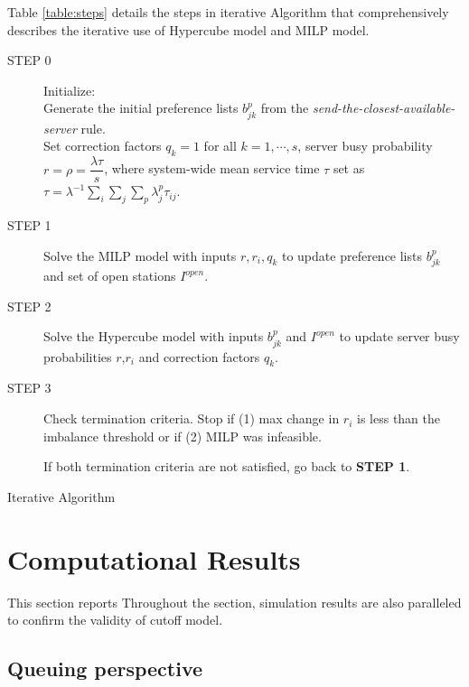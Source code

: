 \documentclass{article}
\begin{document}
Table \eqref{table:steps} details the steps in iterative Algorithm that comprehensively describes the iterative use of Hypercube model and MILP model. 


\begin{table}
\noindent\makebox[\linewidth]{\rule{16cm}{0.4pt}}
\begin{description}
\item[STEP 0] Initialize:\\
Generate the initial preference lists $b^p_{jk}$ from the \textit{send-the-closest-available-server} rule. \\
Set correction factors $q_k=1$ for all $k=1,\cdots,s$, server busy probability $r=\rho=\dfrac{\lambda \tau}{s}$, where system-wide mean service time $\tau$ set as $\tau= \lambda^{-1} \sum_i \sum_j  \sum_p \lambda^p_j \tau_{ij}$.  
\item[STEP 1] Solve the MILP model with inputs $r,r_i,q_k$ to update preference lists $b^p_{jk}$ and set of open stations $I^{open}$.
\item[STEP 2] Solve the Hypercube model with inputs $b^p_{jk}$ and $I^{open}$ to update server busy probabilities $r$,$r_i$ and correction factors $q_k$.
\item[STEP 3] Check termination criteria. Stop if (1) max change in $r_i$ is less than the imbalance threshold or if (2) MILP was infeasible. 

If both termination criteria are not satisfied, go back to \textbf{STEP 1}.
\end{description}
\noindent\makebox[\linewidth]{\rule{16cm}{0.4pt}}

\caption{Iterative Algorithm}
\label{table:steps}

\end{table}





\section{Computational Results}
This section reports 
Throughout the section, simulation results are also paralleled to confirm the validity of cutoff model.



\subsection{Queuing perspective}
\end{document}
